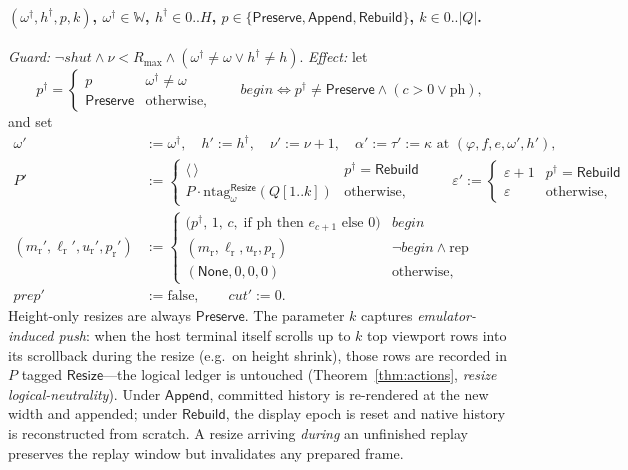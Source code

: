 \documentclass[11pt]{article}
\newcommand{\seq}[1]{\langle #1\rangle}
\newcommand{\emptyseq}{\seq{\,}}
\newcommand{\len}[1]{\lvert #1\rvert}
\newcommand{\cat}{\mathbin{\cdot}}             %
\newcommand{\Wd}{\mathbb{W}}
\newcommand{\Preserve}{\mathsf{Preserve}}
\newcommand{\AppendPol}{\mathsf{Append}}
\newcommand{\Rebuild}{\mathsf{Rebuild}}
\newcommand{\None}{\mathsf{None}}
\newcommand{\srcRsz}{\mathsf{Resize}}
\newcommand{\ntg}{\mathrm{ntag}}
\newcommand{\Canon}{\kappa}
\newcommand{\PH}{\mathrm{ph}}
\newcommand{\Repl}{\mathrm{rep}}
\newcommand{\Native}{P}
\newcommand{\Scr}{Q}
\newcommand{\rmode}{m_{\mathrm{r}}}
\newcommand{\rcur}{\ell_{\mathrm{r}}}
\newcommand{\rend}{u_{\mathrm{r}}}
\newcommand{\rpart}{p_{\mathrm{r}}}
\newcommand{\rprep}{\mathit{prep}}
\newcommand{\rcut}{\mathit{cut}}
\newcommand{\shut}{\mathit{shut}}
\newcommand{\MaxRes}{R_{\max}}
\newcommand{\act}[1]{\text{\normalfont\scshape #1}}
\theoremstyle{definition}
\theoremstyle{remark}
\begin{document}
\paragraph{\act{Resize}$(\omega^{\dagger},h^{\dagger},p,k)$,
$\omega^{\dagger}\in\Wd$, $h^{\dagger}\in 0..H$,
$p\in\{\Preserve,\AppendPol,\Rebuild\}$, $k\in 0..\len{\Scr}$.}
\emph{Guard:} $\neg\shut \wedge \nu<\MaxRes \wedge
(\omega^{\dagger}\ne\omega \vee h^{\dagger}\ne h)$.
\emph{Effect:} let
\[
  p^{\dagger} = \begin{cases} p & \omega^{\dagger}\ne\omega\\
                              \Preserve & \text{otherwise,}\end{cases}
  \qquad
  \mathit{begin} \iff p^{\dagger}\ne\Preserve \wedge (c>0 \vee \PH),
\]
and set
\begin{align*}
  \omega' &:= \omega^{\dagger}, \quad h' := h^{\dagger}, \quad \nu':=\nu+1,
  \quad \alpha':=\tau':=\Canon \text{ at } (\varphi,f,e,\omega',h'),\\
  \Native' &:= \begin{cases}
      \emptyseq & p^{\dagger}=\Rebuild\\
      \Native\cat\ntg^{\srcRsz}_{\omega}(\Scr[1..k]) & \text{otherwise,}
    \end{cases}
  \qquad
  \varepsilon' := \begin{cases}\varepsilon+1 & p^{\dagger}=\Rebuild\\
                               \varepsilon & \text{otherwise,}\end{cases}\\
  (\rmode',\rcur',\rend',\rpart') &:=
    \begin{cases}
      \bigl(p^{\dagger},\,1,\,c,\;
        \text{if } \PH \text{ then } e_{c+1} \text{ else } 0\bigr)
        & \mathit{begin}\\
      (\rmode,\rcur,\rend,\rpart) & \neg\mathit{begin}\wedge\Repl\\
      (\None,0,0,0) & \text{otherwise,}
    \end{cases}\\
  \rprep' &:= \mathrm{false},\qquad \rcut':=0 .
\end{align*}
Height-only resizes are always $\Preserve$. The parameter $k$ captures
\emph{emulator-induced push}: when the host terminal itself scrolls up to $k$
top viewport rows into its scrollback during the resize (e.g.\ on height
shrink), those rows are recorded in $\Native$ tagged $\srcRsz$---the logical
ledger is untouched (Theorem~\ref{thm:actions},
\emph{resize logical-neutrality}). Under $\AppendPol$, committed history is
re-rendered at the new width and appended; under $\Rebuild$, the display epoch
is reset and native history is reconstructed from scratch. A resize arriving
\emph{during} an unfinished replay preserves the replay window but invalidates
any prepared frame.
\end{document}
